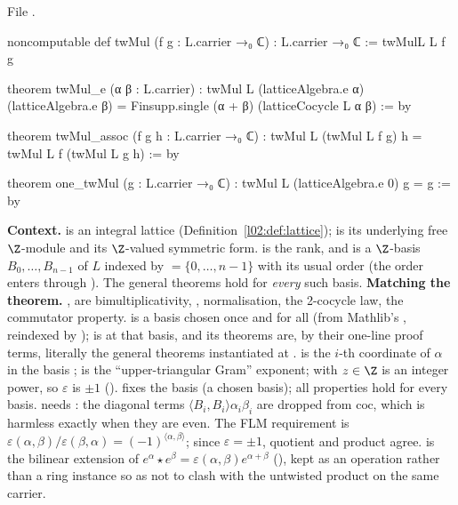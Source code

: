 File .
\begin{leancode}
noncomputable def twMul (f g : L.carrier →₀ ℂ) : L.carrier →₀ ℂ := twMulL L f g

theorem twMul_e (α β : L.carrier) :
    twMul L (latticeAlgebra.e α) (latticeAlgebra.e β)
      = Finsupp.single (α + β) (latticeCocycle L α β) := by

theorem twMul_assoc (f g h : L.carrier →₀ ℂ) :
    twMul L (twMul L f g) h = twMul L f (twMul L g h) := by

theorem one_twMul (g : L.carrier →₀ ℂ) : twMul L (latticeAlgebra.e 0) g = g := by
\end{leancode}

\begin{dictionary}
\textbf{Context.}  is an integral lattice (Definition~\ref{l02:def:lattice});
 is its underlying free $\Z$-module and  its $\Z$-valued symmetric form.  is
the rank, and  is a $\Z$-basis $B_0,\dots,B_{n-1}$ of $L$ indexed by
 $=\{0,\dots,n-1\}$ with its usual order (the order enters through ). The general
theorems hold for \emph{every} such basis. \textbf{Matching the theorem.} ,
 are bimultiplicativity, , 
normalisation,  the 2-cocycle law,  the commutator property.
 is a basis chosen once and for all (from Mathlib's ,
reindexed by );  is  at that basis, and its theorems are, by their
one-line proof terms, literally the general theorems instantiated at .
 is the $i$-th coordinate of $\alpha$ in the basis ;  is the
``upper-triangular Gram'' exponent;  with $z\in\Z$ is an integer power, so $\varepsilon$ is
$\pm1$ ().  fixes the basis  (a chosen basis);
all properties hold for every basis.  needs : the diagonal terms
$\langle B_i,B_i\rangle\alpha_i\beta_i$ are dropped from $\mathrm{coc}$, which is harmless exactly when they are even.
The FLM requirement is $\varepsilon(\alpha,\beta)/\varepsilon(\beta,\alpha) = (-1)^{\langle\alpha,\beta\rangle}$; since $\varepsilon=\pm1$,
quotient and product agree.  is the bilinear extension of
$e^\alpha\star e^\beta = \varepsilon(\alpha,\beta)e^{\alpha+\beta}$ (), kept as an operation rather than a
ring instance so as not to clash with the untwisted product on the same carrier.
\end{dictionary}

